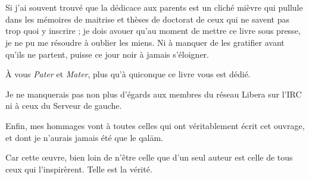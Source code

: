 \documentclass[a5paper,10pt,twoside,french]{book}
\begin{document}
{
\thispagestyle{empty}
\chapter*{}
\thispagestyle{empty}

  \null\vfill           %

    \begin{flushright}
      \begin{minipage}[t]{0.6\textwidth}%
        \em
        \small

        Si j’ai souvent trouvé que la dédicace aux parents est un cliché mièvre qui pullule dans les mémoires de maitrise et thèses de doctorat de ceux qui ne savent pas trop quoi y inscrire ; je dois avouer qu’au moment de mettre ce livre sous presse, je ne pu me résoudre à oublier les miens. Ni à manquer de les gratifier avant qu’ils ne partent, puisse ce jour noir à jamais s’éloigner.

        À vous \emph{Pater} et \emph{Mater}, plus qu’à quiconque ce livre vous est dédié.

        Je ne manquerais pas non plus d’égards aux membres du réseau Libera sur l’IRC ni à ceux du Serveur de gauche.

        Enfin, mes hommages vont à toutes celles qui ont véritablement écrit cet ouvrage, et dont je n’aurais jamais été que le qalām.

        Car cette œuvre, bien loin de n’être celle que d’un seul auteur est celle de tous ceux qui l’inspirèrent. Telle est la vérité.
      \end{minipage}%
    \end{flushright}

  \null\vfill\null                %
}

  \mainmatter

  \backmatter
  \cleardoublepage

  \tableofcontents

  \printendnotes

  \printindex

  \printindex[rhymes]
\end{document}
